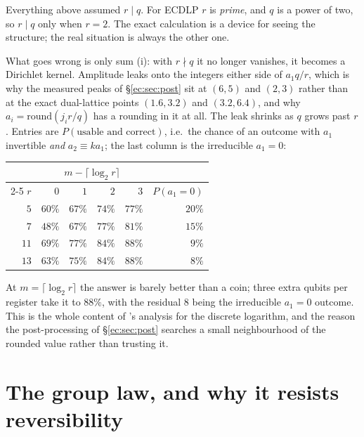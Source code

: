 \documentclass[11pt]{article}
\theoremstyle{plain}
\theoremstyle{remark}
\begin{document}
\begin{warnbox}[title={The clean case never actually happens}]
Everything above assumed $r\mid q$. For ECDLP $r$ is \emph{prime}, and $q$ is a power of two, so
$r\mid q$ only when $r=2$. The exact calculation is a device for seeing the structure; the real
situation is always the other one.

What goes wrong is only sum (i): with $r\nmid q$ it no longer vanishes, it becomes a Dirichlet
kernel. Amplitude leaks onto the integers either side of $a_1q/r$, which is why the measured peaks
of \S\ref{ec:sec:post} sit at $(6,5)$ and $(2,3)$ rather than at the exact dual-lattice points
$(1.6,3.2)$ and $(3.2,6.4)$, and why $a_i=\mathrm{round}(j_ir/q)$ has a rounding in it at all. The
leak shrinks as $q$ grows past $r$. Entries are $P(\text{usable and correct})$, i.e.\ the chance
of an outcome with $a_1$ invertible \emph{and} $a_2\equiv ka_1$; the last column is the irreducible
$a_1=0$:

\begin{center}\small
\begin{tabular}{@{}rrrrrr@{}}
\toprule
& \multicolumn{4}{c}{$m-\lceil\log_2 r\rceil$} & \\
\cmidrule(lr){2-5}
$r$ & $0$ & $1$ & $2$ & $3$ & $P(a_1{=}0)$\\
\midrule
$5$ & $60\%$ & $67\%$ & $74\%$ & $77\%$ & $20\%$\\
$7$ & $48\%$ & $67\%$ & $77\%$ & $81\%$ & $15\%$\\
$11$ & $69\%$ & $77\%$ & $84\%$ & $88\%$ & $9\%$\\
$13$ & $63\%$ & $75\%$ & $84\%$ & $88\%$ & $8\%$\\
\bottomrule
\end{tabular}
\end{center}

\noindent
At $m=\lceil\log_2 r\rceil$ the answer is barely better than a coin; three extra qubits per register
take it to $88\%$, with the residual $8$ being the irreducible $a_1=0$ outcome. This
is the whole content of \cite{ec:ekera}'s analysis for the discrete logarithm, and the reason the
post-processing of \S\ref{ec:sec:post} searches a small neighbourhood of the rounded value rather
than trusting it.
\end{warnbox}

\section{The group law, and why it resists reversibility}\label{ec:sec:grouplaw}
\end{document}
